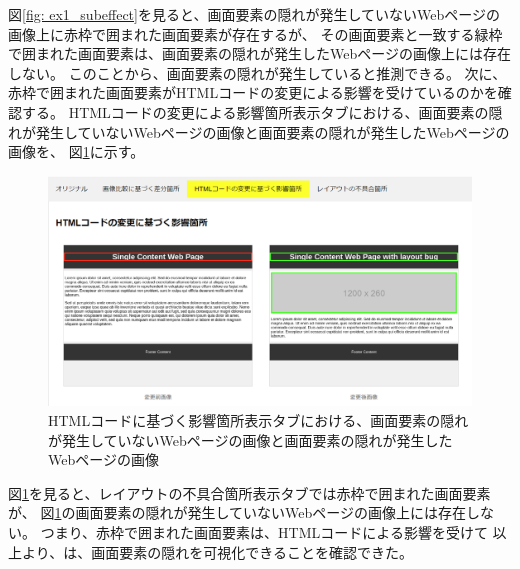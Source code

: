 図\ref{fig: ex1_subeffect}を見ると、画面要素の隠れが発生していないWebページの画像上に赤枠で囲まれた画面要素が存在するが、
その画面要素と一致する緑枠で囲まれた画面要素は、画面要素の隠れが発生したWebページの画像上には存在しない。
このことから、画面要素の隠れが発生していると推測できる。
次に、赤枠で囲まれた画面要素がHTMLコードの変更による影響を受けているのかを確認する。
HTMLコードの変更による影響箇所表示タブにおける、画面要素の隠れが発生していないWebページの画像と画面要素の隠れが発生したWebページの画像を、
図\ref{fig: ex1_html}に示す。
\begin{figure}[tp]
    \begin{center}
        \includegraphics[width=1.0\columnwidth]{image/5/ex1_html.png}
        \caption{HTMLコードに基づく影響箇所表示タブにおける、画面要素の隠れが発生していないWebページの画像と画面要素の隠れが発生したWebページの画像}
        \label{fig: ex1_html}
    \end{center}
\end{figure}
図\ref{fig: ex1_html}を見ると、レイアウトの不具合箇所表示タブでは赤枠で囲まれた画面要素が、
図\ref{fig: ex1_html}の画面要素の隠れが発生していないWebページの画像上には存在しない。
つまり、赤枠で囲まれた画面要素は、HTMLコードによる影響を受けて
以上より、\toolName は、画面要素の隠れを可視化できることを確認できた。
